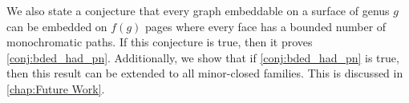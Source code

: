 We also state a conjecture that every graph embeddable on a surface of genus $g$ can be embedded on $f(g)$ pages where every face has a bounded number of monochromatic paths. If this conjecture is true, then it proves \cref{conj:bded_had_pn}. Additionally, we show that if \cref{conj:bded_had_pn} is true, then this result can be extended to all minor-closed families. This is discussed in \cref{chap:Future Work}.